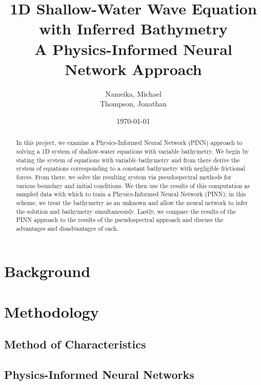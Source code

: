 \documentclass[letterpaper,11pt]{article}
\begin{document}
    \title{%
        1D Shallow-Water Wave Equation with Inferred Bathymetry\\
        \large A Physics-Informed Neural Network Approach
    }
    \author{%
        Nameika, Michael \\
        Thompson, Jonathan
    }
    \date{\today}
    \maketitle

    \begin{abstract}
        In this project, we examine a Physics-Informed Neural Network (PINN) approach to solving a 1D system of 
        shallow-water equations with variable bathymetry. We begin by stating the system of equations with variable
        bathymetry and from there derive the system of equations corresponding to a constant bathymetry with negligible
        frictional forces. From there, we solve the resulting system via pseudospectral methods for various boundary
        and initial conditions. We then use the results of this computation as sampled data with which to train a 
        Physics-Informed Neural Network (PINN); in this scheme, we treat the bathymetry as an unknown and allow the 
        neural network to infer the solution and bathymetry simultaneously. Lastly, we compare the results of the PINN
        approach to the results of the pseudospectral approach and discuss the advantages and disadvantages of each.
    \end{abstract}

    \section{Background}\label{sec:background}

    

    \section{Methodology}\label{sec:proposed-methodology}

    \subsection{Method of Characteristics}\label{subset:moc-methodology}

    

    \subsection{Physics-Informed Neural Networks}\label{subsec:pinn-methodology}
\end{document}
